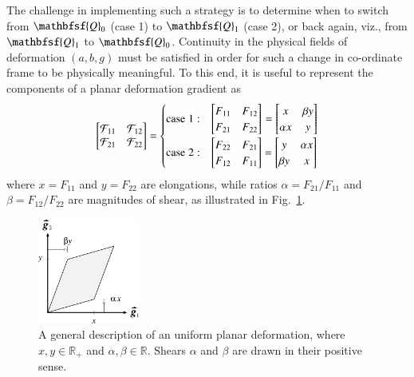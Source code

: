 The challenge in implementing such a strategy is to determine when to switch from $\mathbfsf{Q}_0$ (case 1) to $\mathbfsf{Q}_1$ (case 2), or back again, viz., from $\mathbfsf{Q}_1$ to $\mathbfsf{Q}_0$.  Continuity in the physical fields of deformation $(a , b , g )$ must be satisfied in order for such a change in co-ordinate frame to be physically meaningful.  To this end, it is useful to represent the components of a planar deformation gradient as
\begin{equation}
\begin{bmatrix}
\mathcal{F}_{11} & \mathcal{F}_{12} \\
\mathcal{F}_{21} & \mathcal{F}_{22}
\end{bmatrix} =
\begin{cases}
\mathrm{case} \; 1: & \begin{bmatrix}
F_{11} & F_{12} \\
F_{21} & F_{22}
\end{bmatrix}_{\vphantom{|}} = \begin{bmatrix}
x & \beta y \\ \alpha x & y
\end{bmatrix} \\
\mathrm{case} \; 2: & \begin{bmatrix}
F_{22} & F_{21} \\
F_{12} & F_{11}
\end{bmatrix} = \begin{bmatrix}
y & \alpha x \\ \beta y & x
\end{bmatrix}
\end{cases}
\label{deformationGradientRelabelling}
\end{equation}
where $x = F_{11}$ and $y = F_{22}$ are elongations, while ratios $\alpha = F_{21} / F_{11}$ and $\beta = F_{12} / F_{22}$ are magnitudes of shear, as illustrated in Fig.~\ref{figF}.  

\begin{figure}
	\centering
	\includegraphics[width=0.3\textwidth]{figures/figF.pdf}
	\caption{A general description of an uniform planar deformation, where $x , y \in \mathbb{R}_+$ and $\alpha , \beta \in \mathbb{R}$.  Shears $\alpha$ and $\beta$ are drawn in their positive sense.}
	\label{figF}
\end{figure}

